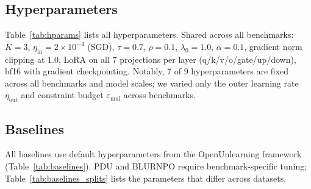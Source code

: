 \subsection{Hyperparameters}
\label{app:hparams}

Table~\ref{tab:hparams} lists all \method hyperparameters.
Shared across all benchmarks: $K{=}3$, $\eta_\text{in}{=}2{\times}10^{-4}$ (SGD), $\tau{=}0.7$, $\rho{=}0.1$, $\lambda_0{=}1.0$, $\alpha{=}0.1$, gradient norm clipping at 1.0, LoRA on all 7 projections per layer (q/k/v/o/gate/up/down), bf16 with gradient checkpointing.
Notably, 7 of 9 hyperparameters are fixed across all benchmarks and model scales; we varied only the outer learning rate $\eta_\text{out}$ and constraint budget $\varepsilon_\text{mul}$ across benchmarks.

\begin{table}[t]
\centering
\small
\caption{Benchmark-specific \method hyperparameters. $^\dagger$T=500 for forget10. $^\ddagger$T=300 for News.}
\label{tab:hparams}
\end{table}

\subsection{Baselines}
\label{app:baselines}

All baselines use default hyperparameters from the OpenUnlearning framework \citep{shi2025muse} (Table~\ref{tab:baselines}).
PDU and BLURNPO require benchmark-specific tuning; Table~\ref{tab:baselines_splits} lists the parameters that differ across datasets.

